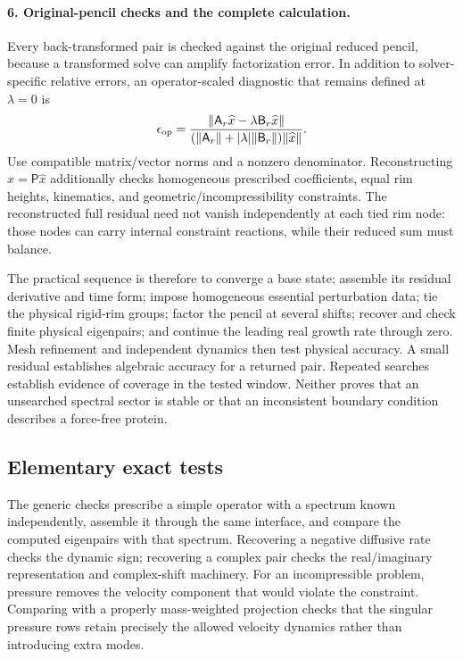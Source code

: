 \paragraph{6. Original-pencil checks and the complete calculation.}
Every back-transformed pair is checked against the original reduced pencil, because a transformed solve can amplify factorization error. In addition to solver-specific relative errors, an operator-scaled diagnostic that remains defined at $\lambda=0$ is
\begin{equation}
\epsilon_{\rm op}=
\frac{\|\mathsf A_r\widehat x-\lambda\mathsf B_r\widehat x\|}
{(\|\mathsf A_r\|+|\lambda|\|\mathsf B_r\|)\|\widehat x\|}.
\label{eq:original-pencil-error}
\end{equation}
Use compatible matrix/vector norms and a nonzero denominator. Reconstructing $x=\mathsf P\widehat x$ additionally checks homogeneous prescribed coefficients, equal rim heights, kinematics, and geometric/incompressibility constraints. The reconstructed full residual need not vanish independently at each tied rim node: those nodes can carry internal constraint reactions, while their reduced sum must balance.

The practical sequence is therefore to converge a base state; assemble its residual derivative and time form; impose homogeneous essential perturbation data; tie the physical rigid-rim groups; factor the pencil at several shifts; recover and check finite physical eigenpairs; and continue the leading real growth rate through zero. Mesh refinement and independent dynamics then test physical accuracy. A small residual establishes algebraic accuracy for a returned pair. Repeated searches establish evidence of coverage in the tested window. Neither proves that an unsearched spectral sector is stable or that an inconsistent boundary condition describes a force-free protein.


\subsection{Elementary exact tests}


The generic checks prescribe a simple operator with a spectrum known independently, assemble it through the same interface, and compare the computed eigenpairs with that spectrum. Recovering a negative diffusive rate checks the dynamic sign; recovering a complex pair checks the real/imaginary representation and complex-shift machinery. For an incompressible problem, pressure removes the velocity component that would violate the constraint. Comparing with a properly mass-weighted projection checks that the singular pressure rows retain precisely the allowed velocity dynamics rather than introducing extra modes.


